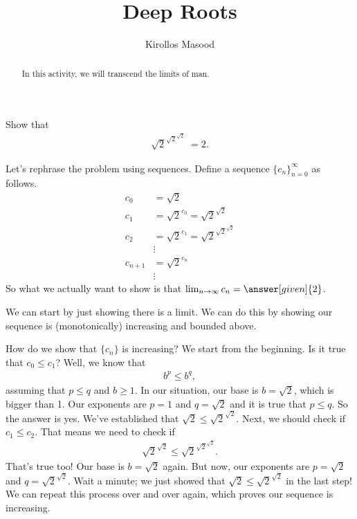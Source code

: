 \documentclass{ximera}
\title{Deep Roots}
\author{Kirollos Masood}
\begin{document}
\begin{abstract}
In this activity, we will transcend the limits of man.
\end{abstract}
\maketitle

\begin{exercise}
	Show that
	\begin{align*}
		\sqrt{2}^{\sqrt{2}^{\sqrt{2}^{\ldots}}  }=2.
	\end{align*}
	
	Let's rephrase the problem using sequences. Define a sequence $\{c_n\}_{n=0}^{\infty}$ as follows.
	\begin{align*}
		c_0 &=\sqrt{2} \\
		c_1 &=\sqrt{2}^{c_0}=\sqrt{2}^{\sqrt{2}} \\
		c_2 &=\sqrt{2}^{c_1}=\sqrt{2}^{\sqrt{2}^{\sqrt{2}}} \\
		&\vdots \\
		c_{n+1}&=\sqrt{2}^{c_n} \\
		&\vdots
	\end{align*}
	So what we actually want to show is that $\lim_{n \to \infty} c_n = \answer[given]{2}$. 
	
	\begin{exercise}
		We can start by just showing there is a limit. We can do this by showing our sequence is (monotonically) increasing and bounded above.
		
		\begin{exercise}
			How do we show that $\{c_n\}$ is increasing? We start from the beginning. Is it true that $c_0 \leq c_1$? Well, we know that
			\begin{align*}
			b^p \leq b^q,
			\end{align*}
			assuming that $p\leq q$ and $b\geq 1$. In our situation, our base is $b=\sqrt{2}$, which is bigger than 1. Our exponents are $p=1$ and $q=\sqrt{2}$ and it is true that $p\leq q$. So the answer is yes. We've established that $\sqrt{2} \leq \sqrt{2}^{\sqrt{2}}$. Next, we should check if $c_1 \leq c_2$. That means we need to check if 
			\begin{align*}
			\sqrt{2}^{\sqrt{2}} \leq \sqrt{2}^{\sqrt{2}^{\sqrt{2}}}.
			\end{align*}
			That's true too! Our base is $b=\sqrt{2}$ again. But now, our exponents are $p=\sqrt{2}$ and $q=\sqrt{2}^{\sqrt{2}}$. Wait a minute; we just showed that $\sqrt{2} \leq \sqrt{2}^{\sqrt{2}}$ in the last step! We can repeat this process over and over again, which proves our sequence is increasing.
		\end{exercise}
		

\end{exercise}
\end{exercise}
\end{document}
